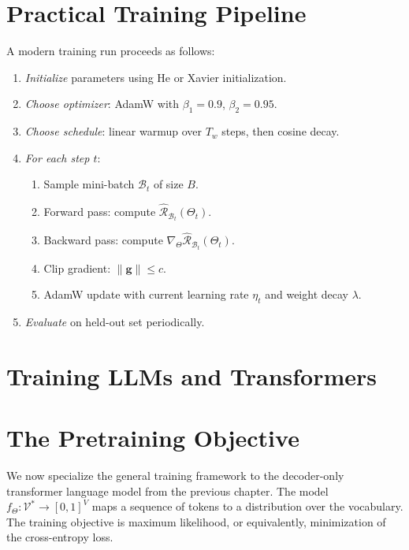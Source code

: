 \documentclass[main.tex]{subfiles}
\begin{document}
\needspace{0.33\textheight}
\section{Practical Training Pipeline}

A modern training run proceeds as follows:

\begin{enumerate}
    \item \textit{Initialize} parameters using He or Xavier initialization.
    \item \textit{Choose optimizer}: AdamW with $\beta_1 = 0.9$, $\beta_2 = 0.95$.
    \item \textit{Choose schedule}: linear warmup over $T_w$ steps, then cosine decay.
    \item \textit{For each step $t$}:
    \begin{enumerate}
        \item Sample mini-batch $\mathcal{B}_t$ of size $B$.
        \item Forward pass: compute $\hat{\mathcal{R}}_{\mathcal{B}_t}(\Theta_t)$.
        \item Backward pass: compute $\nabla_\Theta \hat{\mathcal{R}}_{\mathcal{B}_t}(\Theta_t)$.
        \item Clip gradient: $\|\mathbf{g}\| \leq c$.
        \item AdamW update with current learning rate $\eta_t$ and weight decay $\lambda$.
    \end{enumerate}
    \item \textit{Evaluate} on held-out set periodically.
\end{enumerate}

\newpage
\section*{\Huge\textcolor{mantis}{Training LLMs and Transformers}}
\vspace{0.5cm}

\needspace{0.33\textheight}
\section{The Pretraining Objective}

We now specialize the general training framework to the decoder-only transformer language model from the previous chapter. The model $f_\Theta : \mathcal{V}^* \to [0,1]^V$ maps a sequence of tokens to a distribution over the vocabulary. The training objective is maximum likelihood, or equivalently, minimization of the cross-entropy loss.
\end{document}
